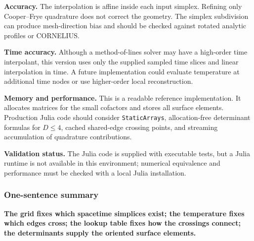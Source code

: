 \documentclass[
  10pt,
]{article}
\begin{document}
\textbf{Accuracy.} The interpolation is affine inside each input
simplex. Refining only Cooper--Frye quadrature does not correct the
geometry. The simplex subdivision can produce mesh-direction bias and
should be checked against rotated analytic profiles or CORNELIUS.

\textbf{Time accuracy.} Although a method-of-lines solver may have a
high-order time interpolant, this version uses only the supplied sampled
time slices and linear interpolation in time. A future implementation
could evaluate temperature at additional time nodes or use higher-order
local reconstruction.

\textbf{Memory and performance.} This is a readable reference
implementation. It allocates matrices for the small cofactors and stores
all surface elements. Production Julia code should consider
\texttt{StaticArrays}, allocation-free determinant formulas for
\(D\le4\), cached shared-edge crossing points, and streaming
accumulation of quadrature contributions.

\textbf{Validation status.} The Julia code is supplied with executable
tests, but a Julia runtime is not available in this environment;
numerical equivalence and performance must be checked with a local Julia
installation.

\subsubsection{One-sentence summary}\label{one-sentence-summary}

\textbf{The grid fixes which spacetime simplices exist; the temperature
fixes which edges cross; the lookup table fixes how the crossings
connect; the determinants supply the oriented surface elements.}
\end{document}

